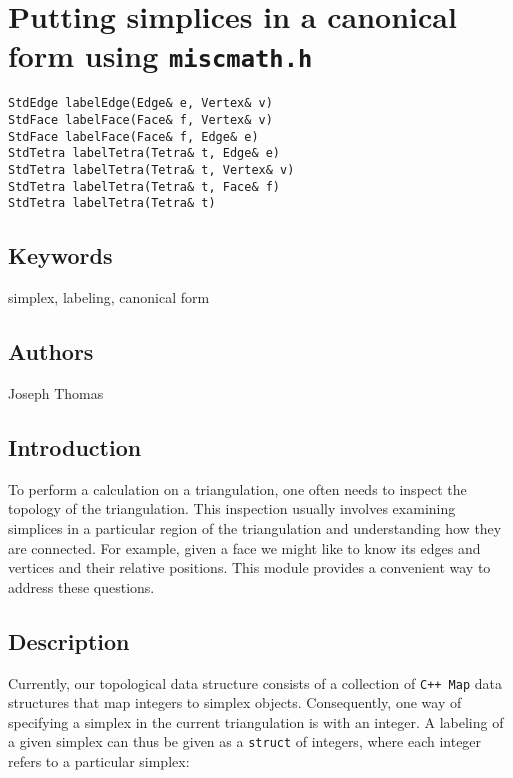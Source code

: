 \documentclass[10pt]{article}%
\begin{document}

\section*{Putting simplices in a canonical form using \texttt{miscmath.h}}

\label{f0}{\small{\begin{verbatim} 
StdEdge labelEdge(Edge& e, Vertex& v)
StdFace labelFace(Face& f, Vertex& v)
StdFace labelFace(Face& f, Edge& e)
StdTetra labelTetra(Tetra& t, Edge& e)
StdTetra labelTetra(Tetra& t, Vertex& v)
StdTetra labelTetra(Tetra& t, Face& f)
StdTetra labelTetra(Tetra& t)
\end{verbatim}
}}

\subsection*{Keywords}

simplex, labeling, canonical form

\subsection*{Authors}

Joseph Thomas

\subsection*{Introduction}

To perform a calculation on a triangulation, one often needs to inspect the topology of the triangulation. This inspection usually involves examining simplices in a particular region of the triangulation and understanding how they are connected. For example, given a face we might like to know its edges and vertices and their relative positions. This module provides a convenient way to address these questions.

\subsection*{Description}

Currently, our topological data structure consists of a collection of \texttt{C++ Map} data structures that map integers to simplex objects. Consequently, one way of specifying a simplex in the current triangulation is with an integer. A labeling of a given simplex can thus be given as a \texttt{struct} of integers, where each integer refers to a particular simplex:
\end{document}
